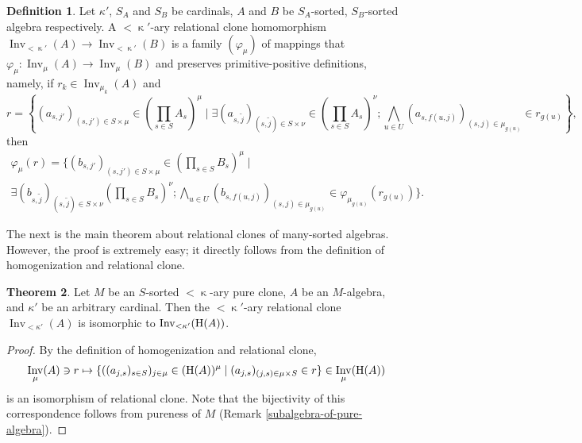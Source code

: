 \documentclass[a4paper,10pt]{article}
\theoremstyle{definition}
\newtheorem{df}{Definition}[section]
\newtheorem{thm}[df]{Theorem}
\newcommand\ph{\varphi}
\newcommand\ra{\rightarrow}
\newcommand\mc{\mathclose}
\DeclareMathOperator{\Inv}{Inv}
\begin{document}
\begin{df}
Let $\kappa'$, $S_A$ and $S_B$ be cardinals, $A$ and $B$ be $S_A$-sorted, $S_B$-sorted algebra respectively.
A $<\mc\kappa'$-ary relational clone homomorphism $\Inv_{<\mc\kappa'}(A)\ra \Inv_{<\mc\kappa'}(B)$
is a family $(\ph_\mu)$ of mappings that $\ph_\mu:\Inv_\mu(A)\ra \Inv_\mu(B)$ and
preserves primitive-positive definitions, namely,
if $r_k\in \Inv_{\mu_k}(A)$ and
\[
r=\left\{(a_{s,j'})_{(s,j')\in S\times\mu}\in \left(\prod_{s\in S}A_s\right)^\mu\mid 
  \exists (a_{s,\tilde{j}})_{(s,\tilde{j})\in S\times\nu}\in\left(\prod_{s\in S}A_s\right)^\nu; 
  \bigwedge_{u\in U} (a_{s,f(u,j)})_{(s,j)\in \mu_{g(u)}}\in r_{g(u)}\right\},
\]
then
\begin{multline*}
\ph_\mu(r)=\Bigg\{(b_{s,j'})_{(s,j')\in S\times\mu}\in
 \left(\prod_{s\in S}B_s\right)^\mu\mid \\
  \exists (b_{s,\tilde{j}})_{(s,\tilde{j})\in S\times\nu}\left(\prod_{s\in S}B_s\right)^\nu; 
  \bigwedge_{u\in U} (b_{s,f(u,j)})_{(s,j)\in \mu_{g(u)}}\in \ph_{\mu_{g(u)}}(r_{g(u)})\Bigg\}.
\end{multline*}
\end{df}

The next is the main theorem about relational clones of many-sorted algebras.
However, the proof is extremely easy;
it directly follows from the definition of homogenization and relational clone.
\begin{thm}\label{many-single-relationa-clone}
Let $M$ be an $S$-sorted $<\mc\kappa$-ary pure clone,
$A$ be an $M$-algebra, and $\kappa'$ be an arbitrary cardinal.
Then the $<\mc\kappa'$-ary relational clone $\Inv_{<\kappa'}(A)$ is isomorphic to
$\Inv_{<\kappa'}({\rm H}(A))$.
\end{thm}
\begin{proof}
By the definition of homogenization and relational clone,
\[
\Inv_\mu(A)\ni r\mapsto 
 \{((a_{j,s})_{s\in S})_{j\in\mu}\in ({\rm H}(A))^\mu\mid(a_{j,s})_{(j,s)\in\mu\times S}\in r\} \in \Inv_{\mu}({\rm H}(A))
\]
is an isomorphism of relational clone.
Note that the bijectivity of this correspondence follows from pureness of $M$
(Remark \ref{subalgebra-of-pure-algebra}).

\end{proof}
\end{document}
